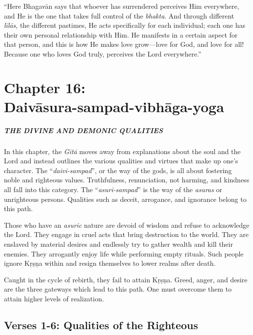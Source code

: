\documentclass[12pt, twoside, openright]{memoir}
\begin{document}
\enquote{Here Bhagavān says that whoever has surrendered perceives Him everywhere, and He is the one that takes full control of the \textit{bhakta}. And through different \textit{līlās}, the different pastimes, He acts specifically for each individual; each one has their own personal relationship with Him. He manifests in a certain aspect for that person, and this is how He makes love grow---love for God, and love for all! Because one who loves God truly, perceives the Lord everywhere.}

 \chapter{Chapter 16: \\Daivāsura-sampad-vibhāga-yoga}\label{chap-daivasura-sampad-vibhaga-yoga}

\paragraph*{\MakeUppercase{The Divine and Demonic Qualities}}
\noindent In this chapter, the \textit{Gītā} moves away from explanations about the soul and the Lord and instead outlines the various qualities and virtues that make up one’s character. The \enquote{\textit{daivi-sampad}}, or the way of the gods, is all about fostering noble and righteous values. Truthfulness, renunciation, not harming, and kindness all fall into this category. The \enquote{\textit{asuri-sampad}} is the way of the \textit{asuras} or unrighteous persons. Qualities such as deceit, arrogance, and ignorance belong to this path.

Those who have an \textit{asuric} nature are devoid of wisdom and refuse to acknowledge the Lord. They engage in cruel acts that bring destruction to the world. They are enslaved by material desires and endlessly try to gather wealth and kill their enemies. They arrogantly enjoy life while performing empty rituals. Such people ignore Kṛṣṇa within and resign themselves to lower realms after death.

Caught in the cycle of rebirth, they fail to attain Kṛṣṇa. Greed, anger, and desire are the three gateways which lead to this path. One must overcome them to attain higher levels of realization.

\section{Verses 1-6: Qualities of the Righteous}\label{sec-verses-1-6-qualities-of-the-righteous}
\end{document}
